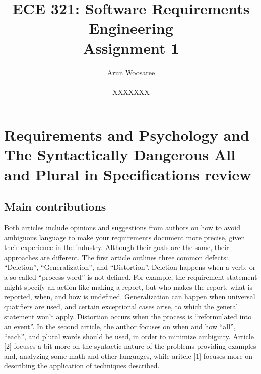 \documentclass[letterpaper,12pt]{article}
\title{ECE 321: Software Requirements Engineering \\ Assignment 1}
\author{Arun Woosaree \\ \\ XXXXXXX}
\begin{document}
\maketitle

\section{Requirements and Psychology
  and
  The Syntactically Dangerous All and Plural in Specifications
  review}

\subsection{Main contributions}
Both articles include opinions and suggestions from authors on how to avoid
ambiguous language to make your requirements document more precise, given their
experience in the industry. Although their goals are the same, their approaches
are different. The first article outlines three common defects: ``Deletion'',
``Generalization'', and ``Distortion''. Deletion happens when a verb, or a
so-called ``process-word'' is not defined. For example, the requirement
statement might specify an action like making a report, but who makes the
report, what is reported, when, and how is undefined. Generalization can happen
when universal quatifiers are used, and certain exceptional cases arise, to
which the general statement won't apply. Distortion occurs when the process is
``reformulated into an event''. In the second article, the author focuses on
when and how ``all'', ``each'', and plural words should be used, in order to
minimize ambiguity. Article [2] focuses a bit more on the syntactic nature of
the problems providing examples and, analyzing some math and other languages,
while aritcle [1] focuses more on describing the application of techniques
described.
\end{document}
